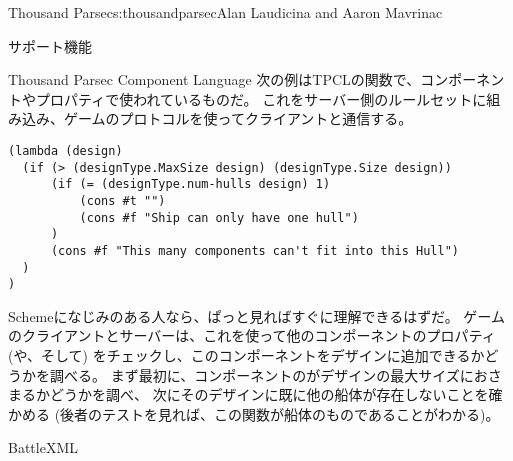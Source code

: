 \begin{aosachapter}{Thousand Parsec}{s:thousandparsec}{Alan Laudicina and Aaron Mavrinac}
\begin{aosasect1}{サポート機能}
\begin{aosasect2}{Thousand Parsec Component Language}
次の例はTPCLの関数で、コンポーネントやプロパティで使われているものだ。
これをサーバー側のルールセットに組み込み、ゲームのプロトコルを使ってクライアントと通信する。

\begin{verbatim}
(lambda (design)
  (if (> (designType.MaxSize design) (designType.Size design))
      (if (= (designType.num-hulls design) 1)
          (cons #t "")
          (cons #f "Ship can only have one hull")
      )
      (cons #f "This many components can't fit into this Hull")
  )
)
\end{verbatim}

Schemeになじみのある人なら、ぱっと見ればすぐに理解できるはずだ。
ゲームのクライアントとサーバーは、これを使って他のコンポーネントのプロパティ
(や、そして)
をチェックし、このコンポーネントをデザインに追加できるかどうかを調べる。
まず最初に、コンポーネントのがデザインの最大サイズにおさまるかどうかを調べ、
次にそのデザインに既に他の船体が存在しないことを確かめる
(後者のテストを見れば、この関数が船体のものであることがわかる)。

\end{aosasect2}

\begin{aosasect2}{BattleXML}


\end{aosasect2}
\end{aosasect1}
\end{aosachapter}
